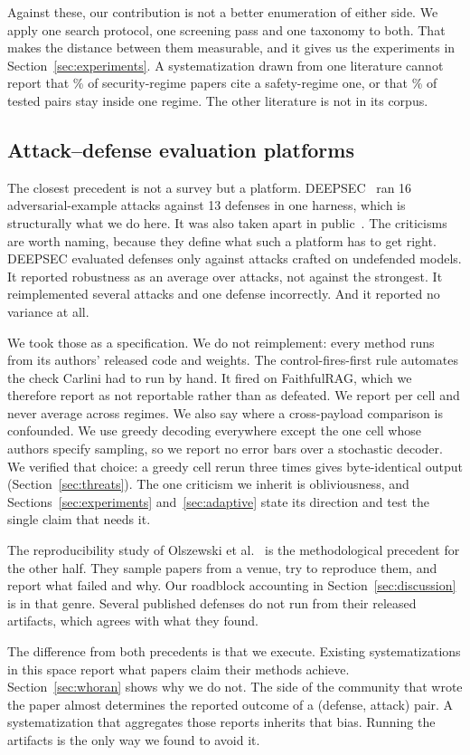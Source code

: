 Against these, our contribution is not a better enumeration of either side. We
apply one search protocol, one screening pass and one taxonomy to both. That
makes the distance between them measurable, and it gives us the experiments in
Section~\ref{sec:experiments}. A systematization drawn from one literature cannot report that
\PctSecCitesSafety{}\% of security-regime papers cite a safety-regime one,
or that \PctSameRegime{}\% of tested pairs stay inside one regime. The other
literature is not in its corpus.

\subsection{Attack--defense evaluation platforms}

The closest precedent is not a survey but a platform.
DEEPSEC~\cite{ling-2019-deepsec} ran 16 adversarial-example attacks against 13
defenses in one harness, which is structurally what we do here. It was also
taken apart in public~\cite{carlini-2019-critique}. The criticisms are worth
naming, because they define what such a platform has to get right. DEEPSEC
evaluated defenses only against attacks crafted on undefended models. It
reported robustness as an average over attacks, not against the strongest. It
reimplemented several attacks and one defense incorrectly. And it reported no
variance at all.

We took those as a specification. We do not reimplement: every method runs
from its authors' released code and weights. The control-fires-first rule
automates the check Carlini had to run by hand. It fired on FaithfulRAG, which
we therefore report as not reportable rather than as defeated. We report per
cell and never average across regimes. We also say where a cross-payload
comparison is confounded. We use greedy decoding everywhere except the one cell whose authors
specify sampling, so we report no error bars over a stochastic decoder. We
verified that choice: a greedy cell rerun three times gives byte-identical
output (Section~\ref{sec:threats}). The one
criticism we inherit is obliviousness, and Sections~\ref{sec:experiments}
and~\ref{sec:adaptive} state its direction and test the single claim that
needs it.

The reproducibility study of Olszewski et
al.~\cite{olszewski-2023-reproducibility} is the methodological precedent for
the other half. They sample papers from a venue, try to reproduce them, and
report what failed and why. Our roadblock accounting in
Section~\ref{sec:discussion} is in that genre. Several published defenses do
not run from their released artifacts, which agrees with what they found.

The difference from both precedents is that we execute. Existing
systematizations in this space report what papers claim their methods
achieve. Section~\ref{sec:whoran} shows why we do not. The side of the
community that wrote the paper almost determines the reported outcome of a
(defense, attack) pair. A systematization that aggregates those reports inherits that
bias. Running the artifacts is the only way we found to avoid it.
